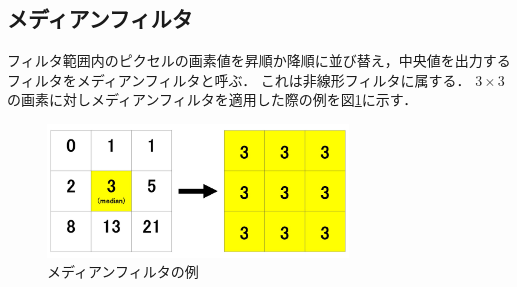 \documentclass[openright]{nitocs}
\numberwithin{equation}{section}
\begin{document}
        \subsection{メディアンフィルタ}
            フィルタ範囲内のピクセルの画素値を昇順か降順に並び替え，中央値を出力するフィルタをメディアンフィルタと呼ぶ\cite{DIP}．
            これは非線形フィルタに属する．
            $3\times3$の画素に対しメディアンフィルタを適用した際の例を図\ref{medianBlur}に示す．

            \begin{figure}[tb] %
                \begin{center}
                \includegraphics[clip,width=80mm]{medianBlur.jpg} 
                \caption{メディアンフィルタの例}
                \label{medianBlur}
                \end{center}
            \end{figure}
\end{document}
